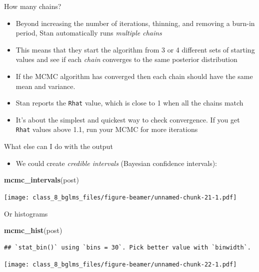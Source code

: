 \documentclass[ignorenonframetext,]{beamer}
\newenvironment{Shaded}{\begin{snugshade}}{\end{snugshade}}
\newcommand{\KeywordTok}[1]{\textcolor[rgb]{0.13,0.29,0.53}{\textbf{#1}}}
\newcommand{\NormalTok}[1]{#1}
\providecommand{\tightlist}{%
  \setlength{\itemsep}{0pt}\setlength{\parskip}{0pt}}
\begin{document}
\begin{frame}[fragile]{How many chains?}

\begin{itemize}
\tightlist
\item
  Beyond increasing the number of iterations, thinning, and removing a
  burn-in period, Stan automatically runs \emph{multiple chains}
\item
  This means that they start the algorithm from 3 or 4 different sets of
  starting values and see if each \emph{chain} converges to the same
  posterior distribution
\item
  If the MCMC algorithm has converged then each chain should have the
  same mean and variance.
\item
  Stan reports the \texttt{Rhat} value, which is close to 1 when all the
  chains match
\item
  It's about the simplest and quickest way to check convergence. If you
  get \texttt{Rhat} values above 1.1, run your MCMC for more iterations
\end{itemize}

\end{frame}

\begin{frame}[fragile]{What else can I do with the output}

\begin{itemize}
\tightlist
\item
  We could create \emph{credible intervals} (Bayesian confidence
  intervals):
\end{itemize}

\tiny

\begin{Shaded}
\begin{Highlighting}[]
\KeywordTok{mcmc_intervals}\NormalTok{(post)}
\end{Highlighting}
\end{Shaded}

\texttt{[image: class\_8\_bglms\_files/figure-beamer/unnamed-chunk-21-1.pdf]}

\end{frame}

\begin{frame}[fragile]{Or histograms}

\tiny

\begin{Shaded}
\begin{Highlighting}[]
\KeywordTok{mcmc_hist}\NormalTok{(post)}
\end{Highlighting}
\end{Shaded}

\begin{verbatim}
## `stat_bin()` using `bins = 30`. Pick better value with `binwidth`.
\end{verbatim}

\texttt{[image: class\_8\_bglms\_files/figure-beamer/unnamed-chunk-22-1.pdf]}

\end{frame}
\end{document}
